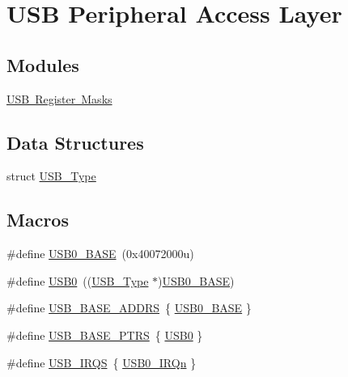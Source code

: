 \hypertarget{group___u_s_b___peripheral___access___layer}{}\section{U\+SB Peripheral Access Layer}
\label{group___u_s_b___peripheral___access___layer}
\subsection*{Modules}
\begin{DoxyCompactItemize}
\item 
\mbox{\hyperlink{group___u_s_b___register___masks}{U\+S\+B Register Masks}}
\end{DoxyCompactItemize}
\subsection*{Data Structures}
\begin{DoxyCompactItemize}
\item 
struct \mbox{\hyperlink{struct_u_s_b___type}{U\+S\+B\+\_\+\+Type}}
\end{DoxyCompactItemize}
\subsection*{Macros}
\begin{DoxyCompactItemize}
\item 
\#define \mbox{\hyperlink{group___u_s_b___peripheral___access___layer_gaa47acf4992407a85e79d911ca1055d17}{U\+S\+B0\+\_\+\+B\+A\+SE}}~(0x40072000u)
\item 
\#define \mbox{\hyperlink{group___u_s_b___peripheral___access___layer_gaea56c015ce8ad0cc88464060fde6d87c}{U\+S\+B0}}~((\mbox{\hyperlink{struct_u_s_b___type}{U\+S\+B\+\_\+\+Type}} $\ast$)\mbox{\hyperlink{group___u_s_b___peripheral___access___layer_gaa47acf4992407a85e79d911ca1055d17}{U\+S\+B0\+\_\+\+B\+A\+SE}})
\item 
\#define \mbox{\hyperlink{group___u_s_b___peripheral___access___layer_gac3fe38a7a5a01a7da6dfcc4a06f4f721}{U\+S\+B\+\_\+\+B\+A\+S\+E\+\_\+\+A\+D\+D\+RS}}~\{ \mbox{\hyperlink{group___u_s_b___peripheral___access___layer_gaa47acf4992407a85e79d911ca1055d17}{U\+S\+B0\+\_\+\+B\+A\+SE}} \}
\item 
\#define \mbox{\hyperlink{group___u_s_b___peripheral___access___layer_gabb481a231c7c57907377d7ee985f826c}{U\+S\+B\+\_\+\+B\+A\+S\+E\+\_\+\+P\+T\+RS}}~\{ \mbox{\hyperlink{group___u_s_b___peripheral___access___layer_gaea56c015ce8ad0cc88464060fde6d87c}{U\+S\+B0}} \}
\item 
\#define \mbox{\hyperlink{group___u_s_b___peripheral___access___layer_ga17e92a5c4b8217467adbbc5ab517c72f}{U\+S\+B\+\_\+\+I\+R\+QS}}~\{ \mbox{\hyperlink{group___interrupt__vector__numbers_gga666eb0caeb12ec0e281415592ae89083ad85ea858fda8e15398b5aa74c019cb7a}{U\+S\+B0\+\_\+\+I\+R\+Qn}} \}
\end{DoxyCompactItemize}


